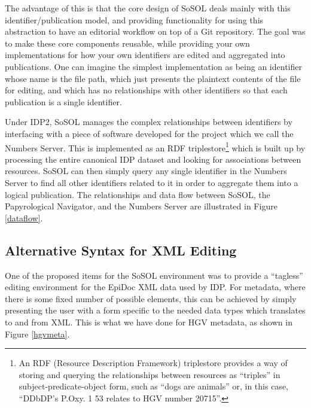 \documentclass[]{article}
\begin{document}
The advantage of this is that the core design of SoSOL deals mainly with this identifier/publication model, and providing functionality for using this abstraction to have an editorial workflow on top of a Git repository. The goal was to make these core components reusable, while providing your own implementations for how your own identifiers are edited and aggregated into publications. One can imagine the simplest implementation as being an identifier whose name is the file path, which just presents the plaintext contents of the file for editing, and which has no relationships with other identifiers so that each publication is a single identifier.

Under IDP2, SoSOL manages the complex relationships between identifiers by interfacing with a piece of software developed for the project which we call the Numbers Server. This is implemented as an RDF triplestore\footnote{\label{rdf}An RDF (Resource Description Framework) triplestore provides a way of storing and querying the relationships between resources as “triples” in subject-predicate-object form, such as “dogs are animals” or, in this case, “DDbDP's P.Oxy. 1 53 relates to HGV number 20715”.} which is built up by processing the entire canonical IDP dataset and looking for associations between resources. SoSOL can then simply query any single identifier in the Numbers Server to find all other identifiers related to it in order to aggregate them into a logical publication. The relationships and data flow between SoSOL, the Papyrological Navigator, and the Numbers Server are illustrated in Figure \ref{dataflow}.

\subsection*{Alternative Syntax for XML Editing}

One of the proposed items for the SoSOL environment was to provide a “tagless” editing environment for the EpiDoc XML data used by IDP. For metadata, where there is some fixed number of possible elements, this can be achieved by simply presenting the user with a form specific to the needed data types which translates to and from XML. This is what we have done for HGV metadata, as shown in Figure \ref{hgvmeta}.
\end{document}
